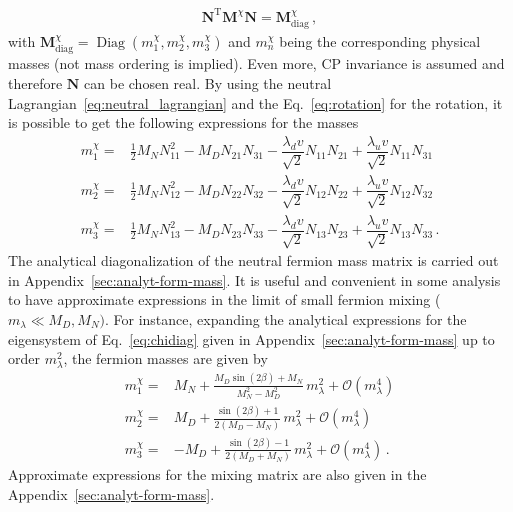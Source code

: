 \begin{align}
\label{eq:chidiag}
 \mathbf{N}^{\operatorname{T}}\mathbf{M}^\chi \mathbf{N}=\mathbf{M}^\chi_\text{diag}\,,
\end{align}
%
with $\textbf{M}^\chi_{\text{diag}}=\operatorname{Diag}(m^\chi_1,m^\chi_2,m^\chi_3)$ and $m^\chi_n$ being the corresponding physical masses (not mass ordering is implied). 
Even more, CP invariance is assumed and therefore $\mathbf{N}$ can be chosen real. By using the neutral Lagrangian~\eqref{eq:neutral_lagrangian} and the Eq.~\eqref{eq:rotation} for the rotation, 
it is possible to get the following expressions for the masses
%
\begin{align}
\label{eq:masses_diag}
m^\chi_1=&\tfrac{1}{2}M_NN_{11}^2 - M_D N_{21}N_{31}-\dfrac{\lambda_dv}{\sqrt{2}}N_{11}N_{21}+\dfrac{\lambda_uv}{\sqrt{2}}N_{11}N_{31}\\
m^\chi_2=&\tfrac{1}{2}M_NN_{12}^2 - M_D N_{22}N_{32}-\dfrac{\lambda_dv}{\sqrt{2}}N_{12}N_{22}+\dfrac{\lambda_uv}{\sqrt{2}}N_{12}N_{32}\\
m^\chi_3=&\tfrac{1}{2}M_NN_{13}^2 - M_D N_{23}N_{33}-\dfrac{\lambda_dv}{\sqrt{2}}N_{13}N_{23}+\dfrac{\lambda_uv}{\sqrt{2}}N_{13}N_{33} \,.
\end{align}
%
The analytical diagonalization of the neutral fermion mass matrix is
carried out in Appendix~\ref{sec:analyt-form-mass}. 
It is useful and convenient in some analysis to have approximate expressions in
the limit of small fermion mixing ($m_\lambda\ll M_D,M_N)$. For instance,
expanding the analytical expressions for the eigensystem of
Eq.~\eqref{eq:chidiag} given in Appendix~\ref{sec:analyt-form-mass}
up to order $m_{\lambda}^2$, the fermion masses are given by
%
\begin{align}
\label{eq:ml2}
m^\chi_1=&M_{N} + \frac{M_{D} \sin{\left (2 \beta \right )} + M_{N}}{M_{N}^{2}- M_{D}^{2} }\, m_{\lambda}^{2}+\mathcal{O}\left( m_{\lambda}^4 \right) \nonumber\\
m^\chi_2=&M_{D} + \frac{ \sin(2 \beta ) + 1}{2 \left( M_{D} -  M_{N} \right)}\,m_{\lambda}^{2}+\mathcal{O}\left( m_{\lambda}^4 \right) \nonumber\\
m^\chi_3=&- M_{D} + \frac{ \sin(2 \beta ) - 1}{2 \left( M_{D} + M_{N} \right) }\,m_{\lambda}^{2}+\mathcal{O}\left( m_{\lambda}^4 \right)\,.
\end{align}
Approximate expressions for the mixing matrix are also given in the Appendix~\ref{sec:analyt-form-mass}.











